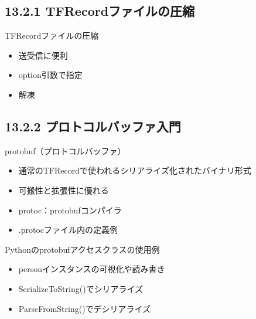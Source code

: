 \documentclass[aspectratio=169, dvipdfmx, 14pt, xcolor={svgnames,dvipsnames}, t]{beamer}
\begin{document}

\hypertarget{tfrecordux30d5ux30a1ux30a4ux30ebux306eux5727ux7e2e}{%
  \subsection{13.2.1 TFRecordファイルの圧縮}\label{tfrecordux30d5ux30a1ux30a4ux30ebux306eux5727ux7e2e}}


\begin{frame}{TFRecordファイルの圧縮}

  \begin{itemize}
    \tightlist
    \item
          送受信に便利
    \item
          option引数で指定
    \item
          解凍
  \end{itemize}

\end{frame}


\hypertarget{ux30d7ux30edux30c8ux30b3ux30ebux30d0ux30c3ux30d5ux30a1ux5165ux9580}{%
  \subsection{13.2.2 プロトコルバッファ入門}\label{ux30d7ux30edux30c8ux30b3ux30ebux30d0ux30c3ux30d5ux30a1ux5165ux9580}}


\begin{frame}{protobuf（プロトコルバッファ）}

  \begin{itemize}
    \tightlist
    \item
          通常のTFRecordで使われるシリアライズ化されたバイナリ形式
    \item
          可搬性と拡張性に優れる
    \item
          protoc：protobufコンパイラ
    \item
          .protocファイル内の定義例
  \end{itemize}

\end{frame}


\begin{frame}{Pythonのprotobufアクセスクラスの使用例}

  \begin{itemize}
    \tightlist
    \item
          personインスタンスの可視化や読み書き
    \item
          SerializeToString()でシリアライズ
    \item
          ParseFromString()でデシリアライズ
  \end{itemize}

\end{frame}
\end{document}
